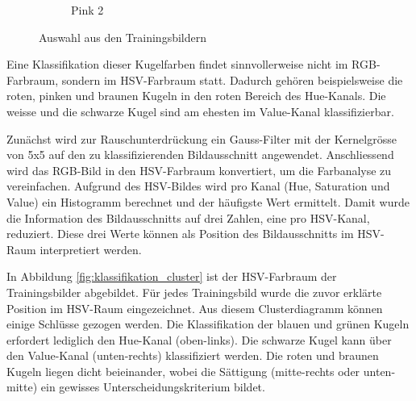 \begin{figure}[h!]
\begin{subfigure}[t]{0.12\textwidth}
        \caption{Pink 2}
        \label{fig:classification_pink_ball_2}
    \end{subfigure}
    \caption{Auswahl aus den Trainingsbildern}
    \label{fig:classification_trainingdata_examples}
\end{figure}

Eine Klassifikation dieser Kugelfarben findet sinnvollerweise nicht im RGB-Farbraum, sondern im HSV-Farbraum \cite{wiki:hsv_color_space} statt.
Dadurch gehören beispielsweise die roten, pinken und braunen Kugeln in den roten Bereich des Hue-Kanals.
Die weisse und die schwarze Kugel sind am ehesten im Value-Kanal klassifizierbar.

Zunächst wird zur Rauschunterdrückung ein Gauss-Filter mit der Kernelgrösse von 5x5 auf den zu klassifizierenden Bildausschnitt angewendet.
Anschliessend wird das RGB-Bild in den HSV-Farbraum konvertiert, um die Farbanalyse zu vereinfachen.
Aufgrund des HSV-Bildes wird pro Kanal (Hue, Saturation und Value) ein Histogramm berechnet und der häufigste Wert ermittelt.
Damit wurde die Information des Bildausschnitts auf drei Zahlen, eine pro HSV-Kanal, reduziert.
Diese drei Werte können als Position des Bildausschnitts im HSV-Raum interpretiert werden.

In Abbildung \ref{fig:klassifikation_cluster} ist der HSV-Farbraum der Trainingsbilder abgebildet.
Für jedes Trainingsbild wurde die zuvor erklärte Position im HSV-Raum eingezeichnet.
Aus diesem Clusterdiagramm können einige Schlüsse gezogen werden.
Die Klassifikation der blauen und grünen Kugeln erfordert lediglich den Hue-Kanal (oben-links).
Die schwarze Kugel kann über den Value-Kanal (unten-rechts) klassifiziert werden.
Die roten und braunen Kugeln liegen dicht beieinander, wobei die Sättigung (mitte-rechts oder unten-mitte) ein gewisses Unterscheidungskriterium bildet.

